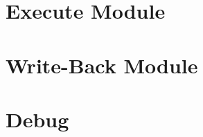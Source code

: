 \newpage

\section{Execute Module}
\newpage

\section{Write-Back Module}
\newpage

\section{Debug}
\newpage
